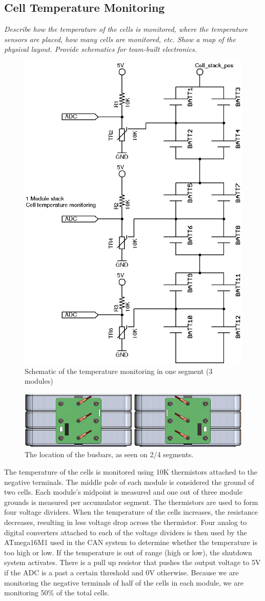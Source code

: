 \documentclass{article}
\begin{document}
\subsection{Cell Temperature Monitoring} \label{celltopsection}

    \textit{Describe how the temperature of the cells is monitored, where the temperature sensors are placed, how many cells are monitored, etc. Show a map of the physical layout. Provide schematics for team-built electronics.}


        \begin{figure}[H]
            \centering
            \includegraphics[width = 0.4 \textwidth]{celltemp}
            \caption{Schematic of the temperature monitoring in one segment (3 modules)}
            \label{celltemp}
        \end{figure}

        \begin{figure}[H]
            \centering
            \includegraphics[width = 0.6 \textwidth]{bus-bar_twosegments}
            \caption{The location of the busbars, as seen on 2/4 segments. }
            \label{celltemplocation}
        \end{figure}

     The temperature of the cells is monitored using 10K thermistors attached to the negative terminals. The middle pole of each module is considered the ground of two cells. Each module's midpoint is measured and one out of three module grounds is measured per accumulator segment. The thermistors are used to form four voltage dividers. When the temperature of the cells increases, the resistance decreases, resulting in less voltage drop across the thermistor. Four analog to digital converters attached to each of the voltage dividers is then used by the ATmega16M1 used in the CAN system to determine whether the temperature is too high or low. If the temperature is out of range (high or low), the shutdown system activates. There is a pull up resistor that pushes the output voltage to 5V if the ADC is a past a certain threshold and 0V otherwise. Because we are monitoring the negative terminals of half of the cells in each module, we are monitoring 50\% of the total cells.
\end{document}
